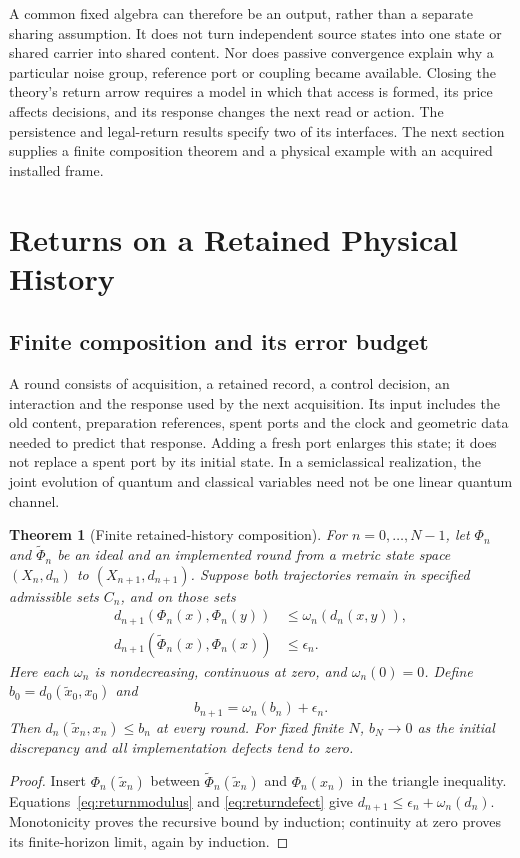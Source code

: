 \documentclass[12pt]{article}
\newtheorem{theorem}{Theorem}[section]
\theoremstyle{definition}
\theoremstyle{remark}
\begin{document}
A common fixed algebra can therefore be an output, rather than a
separate sharing assumption. It does not turn independent source
states into one state or shared carrier into shared content.
Nor does passive convergence explain why a particular noise group,
reference port or coupling became available. Closing the theory's
return arrow requires a model in which that access is formed,
its price affects decisions, and its response changes the next
read or action. The persistence and legal-return results specify two
of its interfaces. The next section supplies a finite composition
theorem and a physical example with an acquired installed frame.


\section{Returns on a Retained Physical History}\label{sec:retainedreturn}

\subsection{Finite composition and its error budget}

A round consists of acquisition, a retained record, a control decision,
an interaction and the response used by the next acquisition. Its input
includes the old content, preparation references, spent ports and the
clock and geometric data needed to predict that response. Adding a
fresh port enlarges this state; it does not replace a spent port by its
initial state. In a semiclassical realization, the joint evolution of
quantum and classical variables need not be one linear quantum channel.

\begin{theorem}[Finite retained-history composition]
\label{thm:retainedcomposition}
For $n=0,\ldots,N-1$, let $\Phi_n$ and $\widetilde\Phi_n$ be an
ideal and an implemented round from a metric state space $(X_n,d_n)$
to $(X_{n+1},d_{n+1})$. Suppose both trajectories remain in specified
admissible sets $C_n$, and on those sets
\begin{align}
 d_{n+1}(\Phi_n(x),\Phi_n(y))
   &\le \omega_n(d_n(x,y)),\label{eq:returnmodulus}\\
 d_{n+1}(\widetilde\Phi_n(x),\Phi_n(x))
   &\le \epsilon_n .\label{eq:returndefect}
\end{align}
Here each $\omega_n$ is nondecreasing, continuous at zero, and
$\omega_n(0)=0$. Define $b_0=d_0(\widetilde x_0,x_0)$ and
\[
 b_{n+1}=\omega_n(b_n)+\epsilon_n.
\]
Then $d_n(\widetilde x_n,x_n)\le b_n$ at every round.
For fixed finite $N$, $b_N\to0$ as the initial discrepancy and all
implementation defects tend to zero.
\end{theorem}
\begin{proof}
Insert $\Phi_n(\widetilde x_n)$ between
$\widetilde\Phi_n(\widetilde x_n)$ and $\Phi_n(x_n)$ in the
triangle inequality. Equations~\eqref{eq:returnmodulus} and
\eqref{eq:returndefect} give
$d_{n+1}\le\epsilon_n+\omega_n(d_n)$.
Monotonicity proves the recursive bound by induction; continuity at
zero proves its finite-horizon limit, again by induction.
\end{proof}
\end{document}
